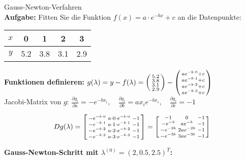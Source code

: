 \begin{example2}{Gauss-Newton-Verfahren}\\
\textbf{Aufgabe:} Fitten Sie die Funktion $f(x) = a \cdot e^{-bx} + c$ an die Datenpunkte:

\begin{center}
\begin{tabular}{|c|c|c|c|c|}
\hline
$x$ & 0 & 1 & 2 & 3 \\
\hline
$y$ & 5.2 & 3.8 & 3.1 & 2.9 \\
\hline
\end{tabular}
\end{center}

\textbf{Funktionen definieren:}
$g(\lambda) = y - f(\lambda) = \begin{psmallmatrix} 5.2 \\ 3.8 \\ 3.1 \\ 2.9 \end{psmallmatrix} - \begin{psmallmatrix} ae^{-b \cdot 0} + c \\ ae^{-b \cdot 1} + c \\ ae^{-b \cdot 2} + c \\ ae^{-b \cdot 3} + c \end{psmallmatrix}$
\vspace{2mm}\\
Jacobi-Matrix von $g$:
$\frac{\partial g_i}{\partial a} = -e^{-bx_i}, \quad \frac{\partial g_i}{\partial b} = ax_ie^{-bx_i}, \quad \frac{\partial g_i}{\partial c} = -1$

$$Dg(\lambda) = \begin{bsmallmatrix}
-e^{-b \cdot 0} & a \cdot 0 \cdot e^{-b \cdot 0} & -1 \\
-e^{-b \cdot 1} & a \cdot 1 \cdot e^{-b \cdot 1} & -1 \\
-e^{-b \cdot 2} & a \cdot 2 \cdot e^{-b \cdot 2} & -1 \\
-e^{-b \cdot 3} & a \cdot 3 \cdot e^{-b \cdot 3} & -1
\end{bsmallmatrix} = \begin{bsmallmatrix}
-1 & 0 & -1 \\
-e^{-b} & ae^{-b} & -1 \\
-e^{-2b} & 2ae^{-2b} & -1 \\
-e^{-3b} & 3ae^{-3b} & -1
\end{bsmallmatrix}$$

\textbf{Gauss-Newton-Schritt mit $\lambda^{(0)} = (2, 0.5, 2.5)^T$:}


\end{example2}
